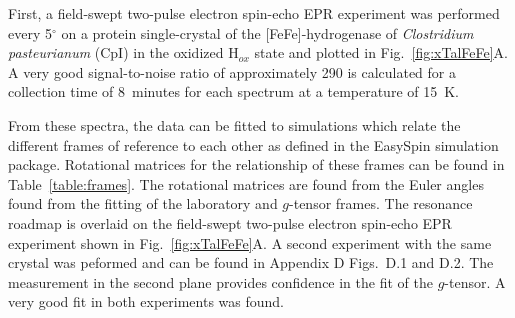 First, a field-swept two-pulse electron spin-echo EPR experiment was performed every 5$^{\circ}$ on a protein single-crystal of the [FeFe]-hydrogenase of {\em Clostridium pasteurianum} (CpI) in the oxidized H$_{ox}$ state and plotted in Fig.~\ref{fig:xTalFeFe}A. A very good signal-to-noise ratio of approximately 290 is calculated for a collection time of 8~minutes for each spectrum at a temperature of 15~K. 

From these spectra, the data can be fitted to simulations which relate the different frames of reference to each other as defined in the EasySpin simulation package. Rotational matrices for the relationship of these frames can be found in Table~\ref{table:frames}. The rotational matrices are found from the Euler angles found from the fitting of the laboratory and $g$-tensor frames. The resonance roadmap is overlaid on the field-swept two-pulse electron spin-echo EPR experiment shown in Fig.~\ref{fig:xTalFeFe}A. A second experiment with the same crystal was peformed and can be found in Appendix D Figs.~D.1 and D.2. The measurement in the second plane provides confidence in the fit of the $g$-tensor. A very good fit in both experiments was found. 

